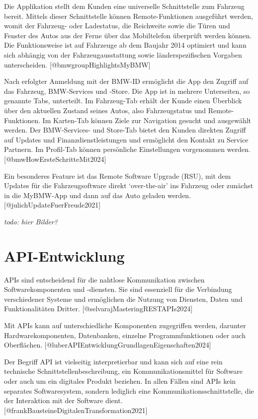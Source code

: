 \documentclass[
  12pt,
  a4paperpaper,
]{report}
\begin{document}
Die Applikation stellt dem Kunden eine universelle Schnittstelle zum
Fahrzeug bereit. Mittels dieser Schnittstelle können Remote-Funktionen
ausgeführt werden, womit der Fahrzeug- oder Ladestatus, die Reichweite
sowie die Türen und Fenster des Autos aus der Ferne über das
Mobiltelefon überprüft werden können. Die Funktionsweise ist auf
Fahrzeuge ab dem Baujahr 2014 optimiert und kann sich abhängig von der
Fahrzeugausstattung sowie länderspezifischen Vorgaben unterscheiden.
{[}@bmwgroupHighlightsMyBMW{]}

Nach erfolgter Anmeldung mit der BMW-ID ermöglicht die App den Zugriff
auf das Fahrzeug, BMW-Services und -Store. Die App ist in mehrere
Unterseiten, so genannte Tabs, unterteilt. Im Fahrzeug-Tab erhält der
Kunde einen Überblick über den aktuellen Zustand seines Autos, also
Fahrzeugstatus und Remote-Funktionen. Im Karten-Tab können Ziele zur
Navigation gesucht und ausgewählt werden. Der BMW-Services- und
Store-Tab bietet den Kunden direkten Zugriff auf Updates und
Finanzdienstleistungen und ermöglicht den Kontakt zu Service Partnern.
Im Profil-Tab können persönliche Einstellungen vorgenommen werden.
{[}@bmwHowErsteSchritteMit2024{]}

Ein besonderes Feature ist das Remote Software Upgrade (RSU), mit dem
Updates für die Fahrzeugsoftware direkt `over-the-air' ins Fahrzeug oder
zunächst in die MyBMW-App und dann auf das Auto geladen werden.
{[}@julichUpdateFuerFreude2021{]}

\emph{todo: hier Bilder?}

\section{API-Entwicklung}\label{api-entwicklung}

APIs sind entscheidend für die nahtlose Kommunikation zwischen
Softwarekomponenten und -diensten. Sie sind essenziell für die
Verbindung verschiedener Systeme und ermöglichen die Nutzung von
Diensten, Daten und Funktionalitäten Dritter.
{[}@selvarajMasteringRESTAPIs2024{]}

Mit APIs kann auf unterschiedliche Komponenten zugegriffen werden,
darunter Hardwarekomponenten, Datenbanken, einzelne Programmfunktionen
oder auch Oberflächen.
{[}@luberAPIEntwicklungGrundlagenEigenschaften2024{]}

Der Begriff API ist vielseitig interpretierbar und kann sich auf eine
rein technische Schnittstellenbeschreibung, ein Kommunikationsmittel für
Software oder auch um ein digitales Produkt beziehen. In allen Fällen
sind APIs kein separates Softwaresystem, sondern lediglich eine
Kommunikationsschnittstelle, die der Interaktion mit der Software dient.
{[}@frankBausteineDigitalenTransformation2021{]}
\end{document}
